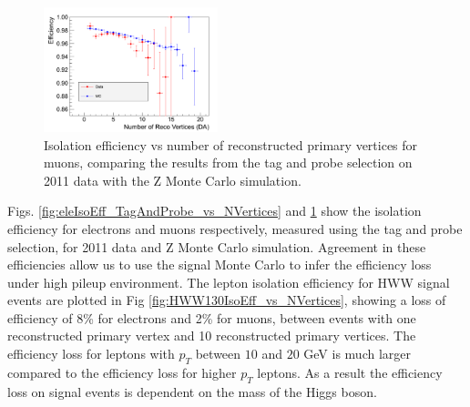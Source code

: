 \begin{figure}[!htbp]
\begin{center}
\includegraphics[width=0.45\textwidth]{figures/MuonIsolationEffVsNVertices_TagAndProbe.pdf}
\caption{Isolation efficiency vs number of reconstructed primary vertices for muons, comparing the 
results from the tag and probe selection on 2011 data with the Z Monte Carlo simulation.}
\label{fig:muIsoEff_TagAndProbe_vs_NVertices}
\end{center}
\end{figure}

Figs. \ref{fig:eleIsoEff_TagAndProbe_vs_NVertices} and \ref{fig:muIsoEff_TagAndProbe_vs_NVertices} 
show the isolation efficiency for electrons and muons respectively, measured using the
tag and probe selection, for 2011 data and Z Monte Carlo simulation. Agreement in these
efficiencies allow us to use the signal Monte Carlo to infer the efficiency loss under 
high pileup environment. The lepton isolation efficiency for HWW signal events are plotted
in Fig \ref{fig:HWW130IsoEff_vs_NVertices}, showing a loss of efficiency of 8\% for 
electrons and 2\% for muons, between events with one reconstructed primary vertex
and 10 reconstructed primary vertices. The efficiency loss for leptons with $p_{T}$ 
between $10$ and $20$ GeV is much larger compared to the efficiency loss for higher
$p_{T}$ leptons. As a result the efficiency loss on signal events is dependent 
on the mass of the Higgs boson. 


